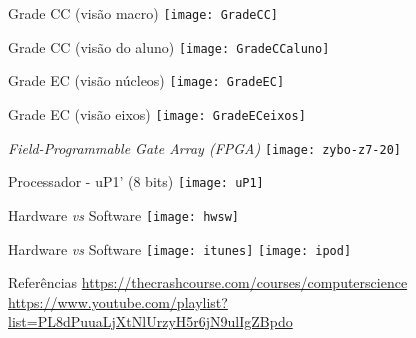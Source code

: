 

\subtitle{Contextualização da Disciplina} %



\begin{frame}
	\titlepage
\end{frame} 

\begin{frame}{Grade CC (visão macro)}
    \texttt{[image: GradeCC]}
\end{frame}

\begin{frame}{Grade CC (visão do aluno)}
    \centering
    \texttt{[image: GradeCCaluno]}
\end{frame}

\begin{frame}{Grade EC (visão núcleos)}
    \texttt{[image: GradeEC]}
\end{frame}

\begin{frame}{Grade EC (visão eixos)}
    \centering
    \texttt{[image: GradeECeixos]}
\end{frame}

\begin{frame}{\textit{Field-Programmable Gate Array (FPGA)}} 
    \centering
    \texttt{[image: zybo-z7-20]}
\end{frame}




\begin{frame}{Processador - uP1' (8 bits)} 
    \texttt{[image: uP1]}
\end{frame}

\begin{frame}{Hardware \textit{vs} Software}
    \centering
    \texttt{[image: hwsw]}
\end{frame}

\begin{frame}{Hardware \textit{vs} Software}
    \texttt{[image: itunes]}
    \pause
    \texttt{[image: ipod]}
\end{frame}

\begin{frame}{Referências}
    \small
    \url{https://thecrashcourse.com/courses/computerscience}
    \url{https://www.youtube.com/playlist?list=PL8dPuuaLjXtNlUrzyH5r6jN9ulIgZBpdo}
\end{frame}


